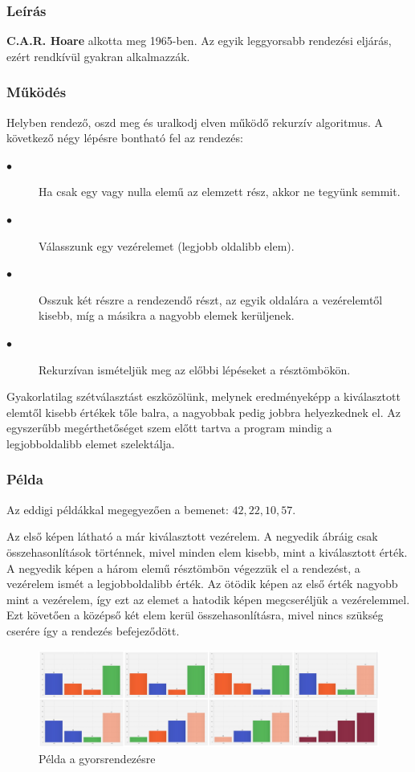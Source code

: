 \documentclass{elteikthesis}
\begin{document}
\subsubsection{Leírás}
\textbf{C.A.R. Hoare}\cite{Horae} alkotta meg 1965-ben. Az egyik leggyorsabb rendezési eljárás, ezért rendkívül gyakran alkalmazzák.
\subsubsection{Működés}
Helyben rendező, oszd meg és uralkodj\cite{Cormen} elven működő rekurzív algoritmus. A következő négy lépésre bontható fel az rendezés:
\begin{description}
	\item[$\bullet$] Ha csak egy vagy nulla elemű az elemzett rész, akkor ne tegyünk semmit.
	\item[$\bullet$] Válasszunk egy vezérelemet (legjobb oldalibb elem).
	\item[$\bullet$] Osszuk két részre a rendezendő részt, az egyik oldalára a vezérelemtől kisebb, míg a másikra a nagyobb elemek kerüljenek.
	\item[$\bullet$] Rekurzívan ismételjük meg az előbbi lépéseket a résztömbökön.
\end{description}
Gyakorlatilag szétválasztást eszközölünk, melynek eredményeképp a kiválasztott elemtől kisebb értékek tőle balra, a nagyobbak pedig jobbra helyezkednek el. Az egyszerűbb megérthetőséget szem előtt tartva a program mindig a legjobboldalibb elemet szelektálja.
 \subsubsection{Példa}
 Az eddigi példákkal megegyezően a bemenet: $42, 22, 10, 57$.\par
 Az első képen látható a már kiválasztott vezérelem. A negyedik ábráig csak összehasonlítások történnek, mivel minden elem kisebb, mint a kiválasztott érték. A negyedik képen a három elemű résztömbön végezzük el a rendezést, a vezérelem ismét a legjobboldalibb érték. Az ötödik képen az első érték nagyobb mint a vezérelem, így ezt az elemet a hatodik képen megcseréljük a vezérelemmel. Ezt követően a középső két elem kerül összehasonlításra, mivel nincs szükség cserére így a rendezés befejeződött.\par
 \begin{figure}[H]
 	\centering
 	\includegraphics[width=1\textwidth]{pics/quick.jpg}
 	\caption{Példa a gyorsrendezésre}
 \end{figure}\par
\end{document}
